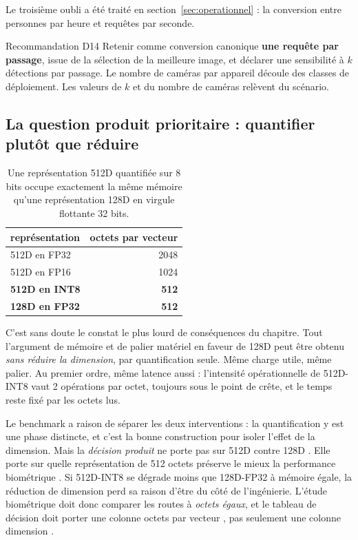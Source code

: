 \documentclass[11pt,a4paper]{article}
\begin{document}
Le troisième oubli a été traité en section~\ref{sec:operationnel} : la conversion
entre personnes par heure et requêtes par seconde.

\begin{encadre}{Recommandation D14}
Retenir comme conversion canonique \textbf{une requête par passage}, issue de la
sélection de la meilleure image, et déclarer une sensibilité à $k$ détections par
passage. Le nombre de caméras par appareil découle des classes de déploiement. Les
valeurs de $k$ et du nombre de caméras relèvent du scénario.
\end{encadre}

\subsection{La question produit prioritaire : quantifier plutôt que réduire}

\begin{table}[h]
\centering\small
\begin{tabular}{@{}lr@{}}
\toprule
représentation & octets par vecteur \\
\midrule
512D en FP32 & \num{2048} \\
512D en FP16 & \num{1024} \\
\textbf{512D en INT8} & \textbf{512} \\
\textbf{128D en FP32} & \textbf{512} \\
\bottomrule
\end{tabular}
\caption{Une représentation 512D quantifiée sur 8 bits occupe exactement la même
mémoire qu'une représentation 128D en virgule flottante 32 bits.}
\label{tab:int8}
\end{table}

C'est sans doute le constat le plus lourd de conséquences du chapitre. Tout l'argument
de mémoire et de palier matériel en faveur de 128D peut être obtenu \emph{sans réduire
la dimension}, par quantification seule. Même charge utile, même palier. Au premier
ordre, même latence aussi : l'intensité opérationnelle de 512D-INT8 vaut 2 opérations
par octet, toujours sous le point de crête, et le temps reste fixé par les octets lus.

Le benchmark a raison de séparer les deux interventions : la quantification y est une
phase distincte, et c'est la bonne construction pour isoler l'effet de la dimension.
Mais la \emph{décision produit} ne porte pas sur \og 512D contre 128D \fg. Elle porte
sur \og quelle représentation de 512 octets préserve le mieux la performance
biométrique \fg. Si 512D-INT8 se dégrade moins que 128D-FP32 à mémoire égale, la
réduction de dimension perd sa raison d'être du côté de l'ingénierie. L'étude
biométrique doit donc comparer les routes à \emph{octets égaux}, et le tableau de
décision doit porter une colonne \og octets par vecteur \fg, pas seulement une colonne
\og dimension \fg.
\end{document}
